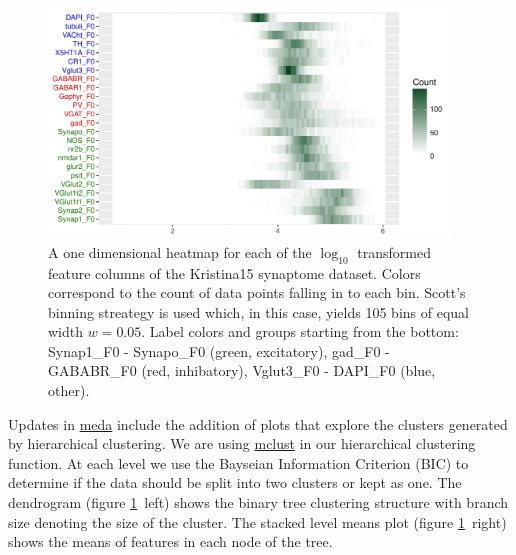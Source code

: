 \documentclass[simplex.tex]{subfiles}
\begin{document}
\begin{figure}[!h]
\begin{cframed}
\centering
\includegraphics[width=0.95\textwidth]{../../figs/201701-meda-1dheat.pdf}
\caption{A one dimensional heatmap for each of the $\log_{10}$
  transformed feature columns of the Kristina15 synaptome dataset.
  Colors correspond to the count of data points falling in to each bin.
  Scott's binning streategy is used which, in this case, yields 105 bins
  of equal width $w = 0.05$. 
  Label colors and groups starting from the bottom:
  \textcolor{jgreen}{Synap1\_F0 - Synapo\_F0 (green, excitatory)},
  \textcolor{jred}{gad\_F0 - GABABR\_F0 (red, inhibatory)},
  \textcolor{jblue}{Vglut3\_F0 - DAPI\_F0 (blue, other)}.
  }
\label{fig:meda}
\end{cframed}
\end{figure}

\clearpage


Updates in \href{https://github.com/neurodata/meda}{meda} include the
addition of plots that explore the clusters generated by
hierarchical clustering.  We are using 
\href{http://www.stat.washington.edu/fraley/mclust/}{mclust}
in our
hierarchical clustering function.  At each level we use the Bayseian
Information Criterion (BIC) to determine if the data should be split
into two clusters or kept as one.  The dendrogram 
(figure \ref{fig:meda}~left)
shows the binary tree clustering structure with branch size denoting the
size of the cluster.  The stacked level means plot
(figure \ref{fig:meda}~right) shows the means of features in each node 
of the tree.
\end{document}
